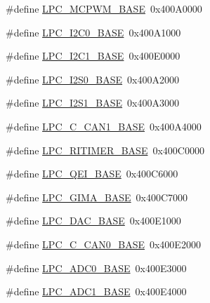 \begin{DoxyCompactItemize}
\item 
\#define \hyperlink{group___p_e_r_i_p_h__18_x_x___b_a_s_e_gad8a41dc802e3ea0ba9457d42a6927c03}{L\+P\+C\+\_\+\+M\+C\+P\+W\+M\+\_\+\+B\+A\+SE}~0x400\+A0000
\item 
\#define \hyperlink{group___p_e_r_i_p_h__18_x_x___b_a_s_e_gab4476c9e874621194369f74fcf26ce92}{L\+P\+C\+\_\+\+I2\+C0\+\_\+\+B\+A\+SE}~0x400\+A1000
\item 
\#define \hyperlink{group___p_e_r_i_p_h__18_x_x___b_a_s_e_gae59f73cf24ff126be3b9a8b921926676}{L\+P\+C\+\_\+\+I2\+C1\+\_\+\+B\+A\+SE}~0x400\+E0000
\item 
\#define \hyperlink{group___p_e_r_i_p_h__18_x_x___b_a_s_e_gae77fe89f0abd4b4b73de7ab5adc822f5}{L\+P\+C\+\_\+\+I2\+S0\+\_\+\+B\+A\+SE}~0x400\+A2000
\item 
\#define \hyperlink{group___p_e_r_i_p_h__18_x_x___b_a_s_e_gad2702d06c20bbf06f072e29ec173e4ab}{L\+P\+C\+\_\+\+I2\+S1\+\_\+\+B\+A\+SE}~0x400\+A3000
\item 
\#define \hyperlink{group___p_e_r_i_p_h__18_x_x___b_a_s_e_ga4715c87f8d58d962b5fa3d4e23e06328}{L\+P\+C\+\_\+\+C\+\_\+\+C\+A\+N1\+\_\+\+B\+A\+SE}~0x400\+A4000
\item 
\#define \hyperlink{group___p_e_r_i_p_h__18_x_x___b_a_s_e_ga37e5300b78c57ef9d338291e79610971}{L\+P\+C\+\_\+\+R\+I\+T\+I\+M\+E\+R\+\_\+\+B\+A\+SE}~0x400\+C0000
\item 
\#define \hyperlink{group___p_e_r_i_p_h__18_x_x___b_a_s_e_ga80fa25b18324c10c8e5c26893e6f0a67}{L\+P\+C\+\_\+\+Q\+E\+I\+\_\+\+B\+A\+SE}~0x400\+C6000
\item 
\#define \hyperlink{group___p_e_r_i_p_h__18_x_x___b_a_s_e_ga487598b990a1a910e078773fb461a9f9}{L\+P\+C\+\_\+\+G\+I\+M\+A\+\_\+\+B\+A\+SE}~0x400\+C7000
\item 
\#define \hyperlink{group___p_e_r_i_p_h__18_x_x___b_a_s_e_ga3bbaedad584252212d4704bb419489f6}{L\+P\+C\+\_\+\+D\+A\+C\+\_\+\+B\+A\+SE}~0x400\+E1000
\item 
\#define \hyperlink{group___p_e_r_i_p_h__18_x_x___b_a_s_e_gad8ad25cb93a229d94ba1de367cbb1fa3}{L\+P\+C\+\_\+\+C\+\_\+\+C\+A\+N0\+\_\+\+B\+A\+SE}~0x400\+E2000
\item 
\#define \hyperlink{group___p_e_r_i_p_h__18_x_x___b_a_s_e_gaeab1b71ab377bf49f50db80ea0c618a8}{L\+P\+C\+\_\+\+A\+D\+C0\+\_\+\+B\+A\+SE}~0x400\+E3000
\item 
\#define \hyperlink{group___p_e_r_i_p_h__18_x_x___b_a_s_e_ga87b2b5b070b1fa91cf2f2bf243420e7d}{L\+P\+C\+\_\+\+A\+D\+C1\+\_\+\+B\+A\+SE}~0x400\+E4000
\item 

\end{DoxyCompactItemize}
